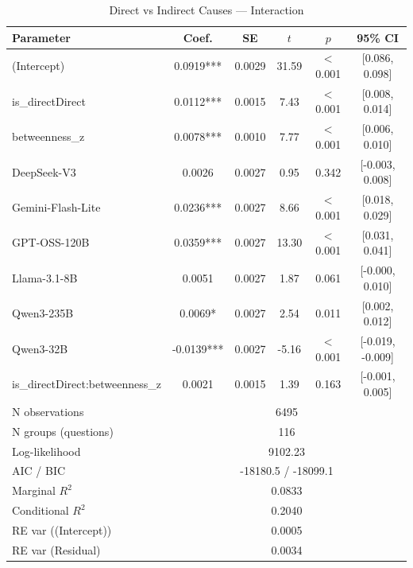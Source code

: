 \begin{table}[htbp]
\centering
\small
\caption{Direct vs Indirect Causes --- Interaction}
\label{tab:lme_direct_interaction_table}
\begin{tabular}{lccccc}
\toprule
Parameter & Coef. & SE & $t$ & $p$ & 95\% CI \\
\midrule
  (Intercept) & 0.0919*** & 0.0029 & 31.59 & $<$0.001 & [0.086, 0.098] \\
  is\_directDirect & 0.0112*** & 0.0015 & 7.43 & $<$0.001 & [0.008, 0.014] \\
  betweenness\_z & 0.0078*** & 0.0010 & 7.77 & $<$0.001 & [0.006, 0.010] \\
  DeepSeek-V3 & 0.0026 & 0.0027 & 0.95 & 0.342 & [-0.003, 0.008] \\
  Gemini-Flash-Lite & 0.0236*** & 0.0027 & 8.66 & $<$0.001 & [0.018, 0.029] \\
  GPT-OSS-120B & 0.0359*** & 0.0027 & 13.30 & $<$0.001 & [0.031, 0.041] \\
  Llama-3.1-8B & 0.0051 & 0.0027 & 1.87 & 0.061 & [-0.000, 0.010] \\
  Qwen3-235B & 0.0069* & 0.0027 & 2.54 & 0.011 & [0.002, 0.012] \\
  Qwen3-32B & -0.0139*** & 0.0027 & -5.16 & $<$0.001 & [-0.019, -0.009] \\
  is\_directDirect:betweenness\_z & 0.0021 & 0.0015 & 1.39 & 0.163 & [-0.001, 0.005] \\
\midrule
  N observations & \multicolumn{5}{c}{6495} \\
  N groups (questions) & \multicolumn{5}{c}{116} \\
  Log-likelihood & \multicolumn{5}{c}{9102.23} \\
  AIC / BIC & \multicolumn{5}{c}{-18180.5 / -18099.1} \\
  Marginal $R^2$ & \multicolumn{5}{c}{0.0833} \\
  Conditional $R^2$ & \multicolumn{5}{c}{0.2040} \\
  RE var ((Intercept)) & \multicolumn{5}{c}{0.0005} \\
  RE var (Residual) & \multicolumn{5}{c}{0.0034} \\
\bottomrule
\end{tabular}
\end{table}
